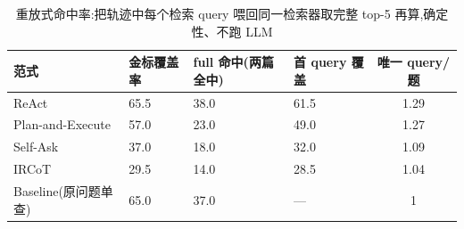 \begin{table}[htbp]
\centering
\caption{重放式命中率:把轨迹中每个检索 query 喂回同一检索器取完整 top-5 再算,确定性、不跑 LLM}
\begin{tabular}{llllc}
\toprule
范式 & 金标覆盖率 & full 命中(两篇全中) & 首 query 覆盖 & 唯一 query/题 \\
\midrule
ReAct & 65.5 & 38.0 & 61.5 & 1.29 \\
Plan-and-Execute & 57.0 & 23.0 & 49.0 & 1.27 \\
Self-Ask & 37.0 & 18.0 & 32.0 & 1.09 \\
IRCoT & 29.5 & 14.0 & 28.5 & 1.04 \\
Baseline(原问题单查) & 65.0 & 37.0 & — & 1 \\
\bottomrule
\end{tabular}
\end{table}
